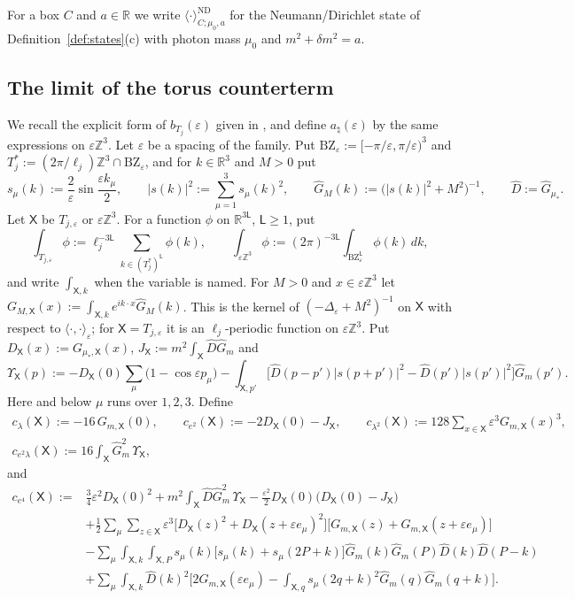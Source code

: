 \documentclass[11pt]{amsart}
\theoremstyle{plain}
\theoremstyle{definition}
\theoremstyle{remark}
\numberwithin{equation}{section}
\newcommand{\R}{\mathbb{R}}
\newcommand{\Z}{\mathbb{Z}}
\newcommand{\eps}{\varepsilon}
\newcommand{\abs}[1]{\lvert #1\rvert}
\newcommand{\ip}[2]{\langle #1,#2\rangle}
\newcommand{\ev}[1]{\langle #1\rangle}
\begin{document}
For a box $C$ and $a\in\R$ we write $\ev\cdot^{\mathrm{ND}}_{C;\mu_0,a}$ for the Neumann/Dirichlet state of Definition~\ref{def:states}(c) with photon mass $\mu_0$ and $m^2+\delta m^2=a$.

\subsection{The limit of the torus counterterm}\label{ssec:ct-limit}
We recall the explicit form of $b_{T_j}(\eps)$ given in \cite[App.~G]{v1}, and define $a_\natural(\eps)$ by the same expressions on $\eps\Z^3$. Let $\eps$ be a spacing of the family. Put $\mathrm{BZ}_\eps:=[-\pi/\eps,\pi/\eps)^3$ and $T_j^*:=(2\pi/\ell_j)\Z^3\cap\mathrm{BZ}_\eps$, and for $k\in\R^3$ and $M>0$ put
\[
s_\mu(k):=\frac2\eps\sin\frac{\eps k_\mu}2,\qquad\abs{s(k)}^2:=\sum_{\mu=1}^3s_\mu(k)^2,\qquad\hat G_M(k):=\big(\abs{s(k)}^2+M^2\big)^{-1},\qquad\hat D:=\hat G_{\mu_*}.
\]
Let $\mathsf X$ be $T_{j,\eps}$ or $\eps\Z^3$. For a function $\phi$ on $\R^{3\mathsf L}$, $\mathsf L\ge1$, put
\[
\int_{T_{j,\eps}}\phi:=\ell_j^{-3\mathsf L}\sum_{k\in(T_j^*)^{\mathsf L}}\phi(k),\qquad\int_{\eps\Z^3}\phi:=(2\pi)^{-3\mathsf L}\int_{\mathrm{BZ}_\eps^{\mathsf L}}\phi(k)\,dk,
\]
and write $\int_{\mathsf X,k}$ when the variable is named. For $M>0$ and $x\in\eps\Z^3$ let $G_{M,\mathsf X}(x):=\int_{\mathsf X,k}e^{ik\cdot x}\hat G_M(k)$. This is the kernel of $(-\Delta_\eps+M^2)^{-1}$ on $\mathsf X$ with respect to $\ip\cdot\cdot_\eps$; for $\mathsf X=T_{j,\eps}$ it is an $\ell_j$-periodic function on $\eps\Z^3$. Put $D_{\mathsf X}(x):=G_{\mu_*,\mathsf X}(x)$, $J_{\mathsf X}:=m^2\int_{\mathsf X}\hat D\hat G_m$ and
\[
\Upsilon_{\mathsf X}(p):=-D_{\mathsf X}(0)\sum_\mu\big(1-\cos\eps p_\mu\big)-\int_{\mathsf X,p'}\Big[\hat D(p-p')\abs{s(p+p')}^2-\hat D(p')\abs{s(p')}^2\Big]\hat G_m(p').
\]
Here and below $\mu$ runs over $1,2,3$. Define
\begin{gather*}
c_\lambda(\mathsf X):=-16\,G_{m,\mathsf X}(0),\qquad c_{e^2}(\mathsf X):=-2D_{\mathsf X}(0)-J_{\mathsf X},\qquad c_{\lambda^2}(\mathsf X):=128\sum_{x\in\mathsf X}\eps^3G_{m,\mathsf X}(x)^3,\\
c_{e^2\lambda}(\mathsf X):=16\int_{\mathsf X}\hat G_m^2\,\Upsilon_{\mathsf X},
\end{gather*}
and
\begin{align*}
c_{e^4}(\mathsf X):={}&\tfrac34\eps^2D_{\mathsf X}(0)^2+m^2\int_{\mathsf X}\hat D\hat G_m^2\,\Upsilon_{\mathsf X}-\tfrac{\eps^2}2D_{\mathsf X}(0)\big(D_{\mathsf X}(0)-J_{\mathsf X}\big)\\
&+\frac12\sum_\mu\sum_{z\in\mathsf X}\eps^3\big[D_{\mathsf X}(z)^2+D_{\mathsf X}(z+\eps e_\mu)^2\big]\big[G_{m,\mathsf X}(z)+G_{m,\mathsf X}(z+\eps e_\mu)\big]\\
&-\sum_\mu\int_{\mathsf X,k}\int_{\mathsf X,P}s_\mu(k)\big[s_\mu(k)+s_\mu(2P+k)\big]\hat G_m(k)\hat G_m(P)\hat D(k)\hat D(P-k)\\
&+\sum_\mu\int_{\mathsf X,k}\hat D(k)^2\Big[2G_{m,\mathsf X}(\eps e_\mu)-\int_{\mathsf X,q}s_\mu(2q+k)^2\hat G_m(q)\hat G_m(q+k)\Big].
\end{align*}
\end{document}
